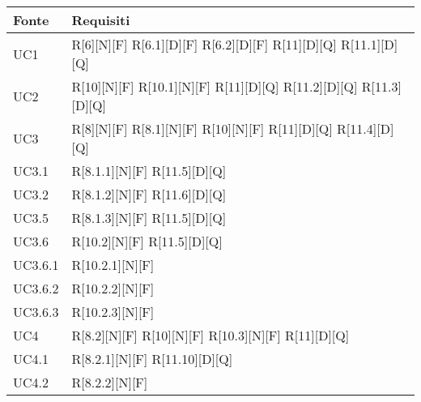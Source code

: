 
\begin{longtable}{X | X}  
			\rowcolor{orange!85}Fonte & Requisiti \\
\endhead
		UC1 & 
		R[6][N][F] \newline
		R[6.1][D][F] \newline
		R[6.2][D][F]  \newline
		R[11][D][Q]\newline
		R[11.1][D][Q] \\
		\hline
		UC2 & 
		R[10][N][F] \newline
		R[10.1][N][F] \newline
		R[11][D][Q] \newline
		R[11.2][D][Q] \newline
		R[11.3][D][Q] \\
		\hline
		UC3 &
		 R[8][N][F] \newline
		 R[8.1][N][F] \newline
		 R[10][N][F] \newline 
		 R[11][D][Q] \newline
		 R[11.4][D][Q] \\
		\hline
		UC3.1 &
			R[8.1.1][N][F] \newline
			R[11.5][D][Q] \\
		\hline
		UC3.2 & 
		R[8.1.2][N][F] \newline
		R[11.6][D][Q] \\
		\hline
		UC3.5 &
		R[8.1.3][N][F] \newline
		R[11.5][D][Q] \\
		\hline
		UC3.6 & 
		R[10.2][N][F] \newline
		R[11.5][D][Q] \\
		\hline
		UC3.6.1 & 
		R[10.2.1][N][F] \\
		\hline
		UC3.6.2 &
		R[10.2.2][N][F] \\
		\hline
		UC3.6.3 & 
		R[10.2.3][N][F] \\
		\hline
		UC4 & 
		R[8.2][N][F] \newline
		R[10][N][F] \newline
		R[10.3][N][F] \newline
		R[11][D][Q] \\
		\hline
		UC4.1 &
		R[8.2.1][N][F] \newline
		R[11.10][D][Q] \\
		\hline
		UC4.2 & 
		R[8.2.2][N][F] \newline

\end{longtable}
